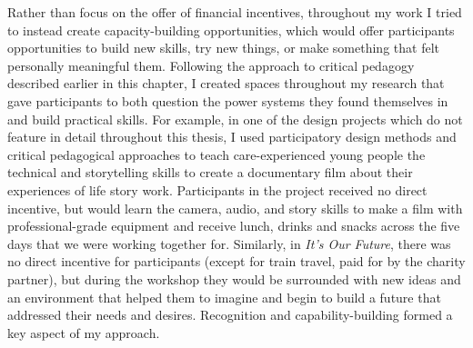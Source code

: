 Rather than focus on the offer of financial incentives, throughout my work I tried to instead create capacity-building opportunities, which would offer participants opportunities to build new skills, try new things, or make something that felt personally meaningful them. Following the approach to critical pedagogy described earlier in this chapter, I created spaces throughout my research that gave participants to both question the power systems they found themselves in and build practical skills. For example, in one of the design projects which do not feature in detail throughout this thesis, I used participatory design methods and critical pedagogical approaches to teach care-experienced young people the technical and storytelling skills to create a documentary film about their experiences of life story work. Participants in the project received no direct incentive, but would learn the camera, audio, and story skills to make a film with professional-grade equipment and receive lunch, drinks and snacks across the five days that we were working together for. Similarly, in \emph{It’s Our Future}, there was no direct incentive for participants (except for train travel, paid for by the charity partner), but during the workshop they would be surrounded with new ideas and an environment that helped them to imagine and begin to build a future that addressed their needs and desires. Recognition and capability-building formed a key aspect of my approach. 

